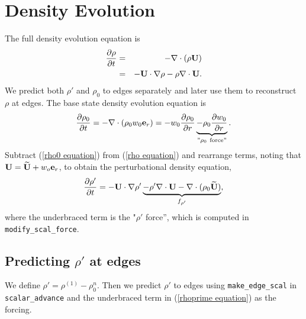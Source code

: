 
\section{Density Evolution}
The full density evolution equation is
\begin{eqnarray}
\frac{\partial\rho}{\partial t} &=& -\nabla\cdot(\rho{\bf U}) \nonumber \\
&=& -{\bf U}\cdot\nabla\rho - \rho\nabla\cdot{\bf U}. \label{rho equation}
\end{eqnarray}
We predict both $\rho'$ and $\rho_0$ to edges separately and later use them to 
reconstruct $\rho$ at edges.  The base state density evolution equation is
\begin{equation}
\frac{\partial\rho_0}{\partial t} = -\nabla\cdot(\rho_0 w_0 {\bf e}_r) = 
-w_0\frac{\partial\rho_0}{\partial r} 
\underbrace{-\rho_0\frac{\partial w_0}{\partial r}}_{"\rho_0 ~ \text{force}"}.
\label{rho0 equation}
\end{equation}
Subtract (\ref{rho0 equation}) from (\ref{rho equation}) and rearrange
terms, noting that ${\bf U} = \widetilde{{\bf U}} + w_o{\bf e}_r$, to obtain the
perturbational density equation,
\begin{equation}
\frac{\partial\rho'}{\partial t} = -{\bf U}\cdot\nabla\rho' \underbrace{- \rho'\nabla\cdot{\bf U} 
- \nabla\cdot(\rho_0\widetilde{{\bf U}})}_{f_{\rho'}},
\label{rhoprime equation}
\end{equation}
where the underbraced term is the "$\rho'$ force'', which is computed 
in {\tt modify\_scal\_force}.

\subsection{Predicting $\rho'$ at edges}
We define $\rho' = \rho^{(1)} - \rho_0^n$.  Then we predict $\rho'$ to
edges using {\tt make\_edge\_scal} in {\tt scalar\_advance} and the
underbraced term in (\ref{rhoprime equation}) as the forcing.

